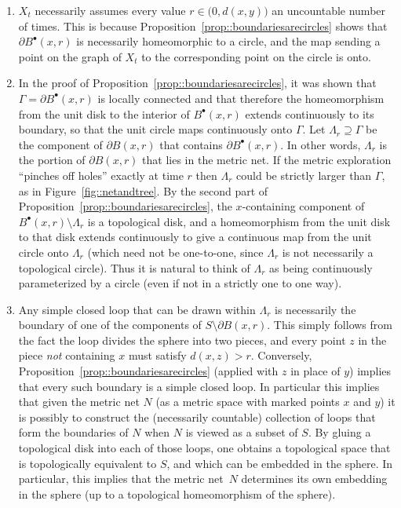 \documentclass[10pt]{amsart}
\newcommand{\sbullet}{{\scriptscriptstyle\bullet}}
\theoremstyle{plain}
\numberwithin{theorem}{section}
\theoremstyle{definition}
\newcommand{\fb}[2]{B^\sbullet(#1,#2)}
\begin{document}
\begin{enumerate}
\item $X_t$ necessarily assumes every value $r \in \bigl( 0, d(x,y) \bigr)$ an uncountable number of times. This is because Proposition~\ref{prop::boundariesarecircles} shows that $\partial \fb{x}{r}$ is necessarily homeomorphic to a circle, and the map sending a point on the graph of $X_t$ to the corresponding point on the circle is onto.
\item In the proof of Proposition~\ref{prop::boundariesarecircles}, it was shown that $\Gamma = \partial \fb{x}{r}$ is locally connected and that therefore the homeomorphism from the unit disk to the interior of $\fb{x}{r}$ extends continuously to its boundary, so that the unit circle maps continuously onto $\Gamma$. Let $\Lambda_r \supseteq \Gamma$ be the component of $\partial B(x,r)$ that contains $\partial \fb{x}{r}$. In other words, $\Lambda_r$ is the portion of $\partial B(x,r)$ that lies in the metric net. If the metric exploration ``pinches off holes'' exactly at time $r$ then $\Lambda_r$ could be strictly larger than $\Gamma$, as in Figure~\ref{fig::netandtree}. By the second part of Proposition~\ref{prop::boundariesarecircles}, the $x$-containing component of $\fb{x}{r} \setminus \Lambda_r$ is a topological disk, and a homeomorphism from the unit disk to that disk extends continuously to give a continuous map from the unit circle onto $\Lambda_r$ (which need not be one-to-one, since $\Lambda_r$ is not necessarily a topological circle). Thus it is natural to think of $\Lambda_r$ as being continuously parameterized by a circle (even if not in a strictly one to one way).
\item Any simple closed loop that can be drawn within $\Lambda_r$ is necessarily the boundary of one of the components of $S \setminus \partial B(x,r)$. This simply follows from the fact the loop divides the sphere into two pieces, and every point $z$ in the piece \emph{not} containing $x$ must satisfy $d(x,z) > r$. Conversely, Proposition~\ref{prop::boundariesarecircles} (applied with $z$ in place of $y$) implies that every such boundary is a simple closed loop. In particular this implies that given the metric net $N$ (as a metric space with marked points $x$ and $y$) it is possibly to construct the (necessarily countable) collection of loops that form the boundaries of $N$ when $N$ is viewed as a subset of $S$. By gluing a topological disk into each of those loops, one obtains a topological space that is topologically equivalent to $S$, and which can be embedded in the sphere. In particular, this implies that the metric net~$N$ determines its own embedding in the sphere (up to a topological homeomorphism of the sphere).

\end{enumerate}
\end{document}
